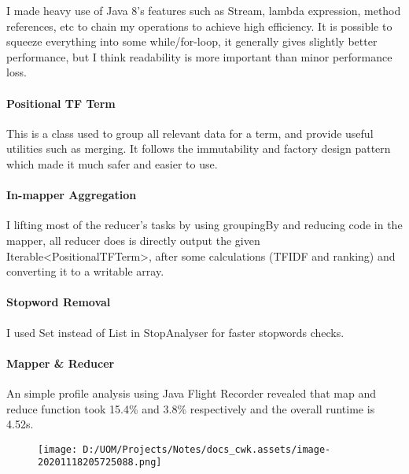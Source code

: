 \documentclass[
]{article}
\begin{document}
I made heavy use of Java 8's features such as Stream, lambda expression,
method references, etc to chain my operations to achieve high
efficiency. It is possible to squeeze everything into some
while/for-loop, it generally gives slightly better performance, but I
think readability is more important than minor performance loss.

\hypertarget{header-n104}{%
\paragraph{Positional TF Term}\label{header-n104}}

This is a class used to group all relevant data for a term, and provide
useful utilities such as merging. It follows the immutability and
factory design pattern which made it much safer and easier to use.

\hypertarget{header-n308}{%
\paragraph{In-mapper Aggregation}\label{header-n308}}

I lifting most of the reducer's tasks by using groupingBy and reducing
code in the mapper, all reducer does is directly output the given
Iterable\textless{}PositionalTFTerm\textgreater{}, after some
calculations (TFIDF and ranking) and converting it to a writable array.

\hypertarget{header-n327}{%
\paragraph{Stopword Removal}\label{header-n327}}

I used Set instead of List in StopAnalyser for faster stopwords checks.

\hypertarget{header-n442}{%
\paragraph{Mapper \& Reducer}\label{header-n442}}

An simple profile analysis using Java Flight Recorder revealed that map
and reduce function took 15.4\% and 3.8\% respectively and the overall
runtime is 4.52s.

\begin{figure}
\centering
\texttt{[image: D:/UOM/Projects/Notes/docs\_cwk.assets/image-20201118205725088.png]}
\caption{}
\end{figure}
\end{document}
